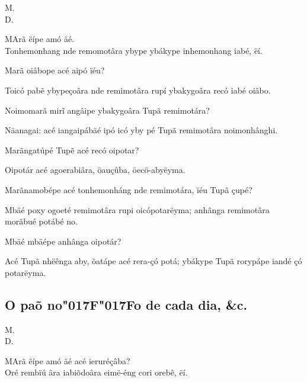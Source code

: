 \documentclass[openany,titlepage,12pt]{book}
\newcommand{\lgSS}{\char"017F\char"017F}
\newcommand{\comecalista}[5]{
    \hspace*{-11.7pt}
    \begin{minipage}[t]{0.08\linewidth}
        \flushright #1\\#2
    \end{minipage}
    \hspace{0pt}
    \begin{minipage}[t]{0.94\linewidth}
        \lettrine
        [findent =2pt, nindent=0pt,  lines=2]
        {#3}{#4}#5
    \end{minipage}
    \vspace*{-3pt}
}
\begin{document}
\comecalista{M.}{D.}{M}{A}
    {rã ëípe amó äé.\\
    Tonhemonhang nde remomotâra ybype
    ybákype inhemonhang iabé, ëí.}
\begin{alternate}
    \item Marã oiâbope acé aipó ïéu?
    \item Toicó pabẽ ybypeçoâra nde remimotâra
    rupí ybakygoâra recó iabé oiâbo.
    \item Noimomarã mirĩ angâipe ybakygoâra\linebreak
    Tupã remimotára?
    \item Näanagai: acé iangaipábäé ipó icó yby pé Tupã
    remimotâra noimonhânghi.
    \item Marãngatúpé Tupẽ acé recó oipotar?
    \item Oipotár acé agoerabiâra, öauçûba, öecö-abyëyma.
    \item Marãnamobépe acé tonhemonháng nde remimotára,
    ïéu Tupã çupé?
    \item Mbäé poxy ogoeté remimotâra rupi oicópotarëyma;
    anhânga remimotâra morãbué potábé no.
    \item Mbäé mbäépe anhânga oipotár?
    \item Acé Tupã nhëênga aby, öatápe acé rera-çó potá;
    ybákype Tupã rorypápe iandé çó potarëyma.
\end{alternate}

\subsection{O paõ no\lgSS o de cada dia, \&c.}

\comecalista{M.}{D.}{M}{A}
    {rã ëípe amó äé acé ieruréçâba?\\
    Oré rembïú âra iabiõdoâra eimë-éng cori orebê, ëí.}
\end{document}
